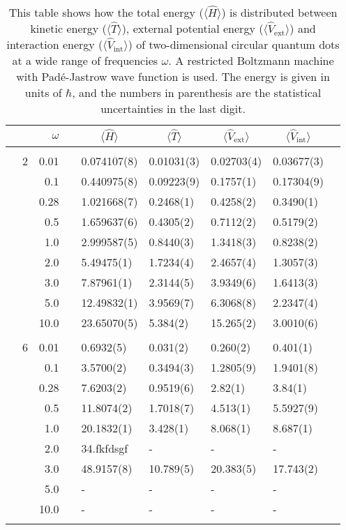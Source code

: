\begin{table}[H]
	\caption{This table shows how the total energy ($\langle\hat{H}\rangle$) is distributed between kinetic energy ($\langle\hat{T}\rangle$), external potential energy ($\langle\hat{V}_{\text{ext}}\rangle$) and interaction energy ($\langle\hat{V}_{\text{int}}\rangle$) of two-dimensional circular quantum dots at a wide range of frequencies $\omega$. A restricted Boltzmann machine with Padé-Jastrow wave function is used. The energy is given in units of $\hbar$, and the numbers in parenthesis are the statistical uncertainties in the last digit.}
	\label{tab:splitfrequencyQDRBMPJ}
	\begin{tabularx}{\textwidth}{R{1cm}rrcR{2.3cm}R{2.3cm}R{2.3cm}R{2.3cm}R{1cm}} \hline\hline
		&\makecell{\\ \phantom{$N$} \\ \phantom{=}} & $\omega$ &&  &  &  &  & \\ \hline \\
		&2 & 0.01 && 0.074107(8) & 0.01031(3) & 0.02703(4) & 0.03677(3) \\
		&& 0.1 && 0.440975(8) & 0.09223(9) & 0.1757(1) & 0.17304(9) \\
		&& 0.28 && 1.021668(7) & 0.2468(1) & 0.4258(2) & 0.3490(1) \\
		&& 0.5 && 1.659637(6) & 0.4305(2) & 0.7112(2) & 0.5179(2) \\
		&& 1.0 && 2.999587(5) & 0.8440(3) & 1.3418(3) & 0.8238(2) \\
		&& 2.0 && 5.49475(1) & 1.7234(4) & 2.4657(4) & 1.3057(3) \\
		&& 3.0 && 7.87961(1) & 2.3144(5) & 3.9349(6) & 1.6413(3) \\
		&& 5.0 && 12.49832(1) & 3.9569(7) & 6.3068(8) & 2.2347(4) \\
		&& 10.0 && 23.65070(5) & 5.384(2) & 15.265(2) & 3.0010(6) \\
		\hdashline \\
		
		&6 & 0.01 && 0.6932(5) & 0.031(2) & 0.260(2) & 0.401(1) \\
		&& 0.1 && 3.5700(2) & 0.3494(3) & 1.2805(9) & 1.9401(8) \\
		&& 0.28 && 7.6203(2) & 0.9519(6) & 2.82(1) & 3.84(1) \\
		&& 0.5 && 11.8074(2) & 1.7018(7) & 4.513(1) & 5.5927(9) \\
		&& 1.0 && 20.1832(1) & 3.428(1) & 8.068(1) & 8.687(1) \\
		&& 2.0 && 34.fkfdsgf & - & - & -\\
		&& 3.0 && 48.9157(8) & 10.789(5) & 20.383(5) & 17.743(2) \\ 
		&& 5.0 && - & - & - & -\\
		&& 10.0 && - & - & - & -\\
		\hdashline \\
		

\end{tabularx}
\end{table}
